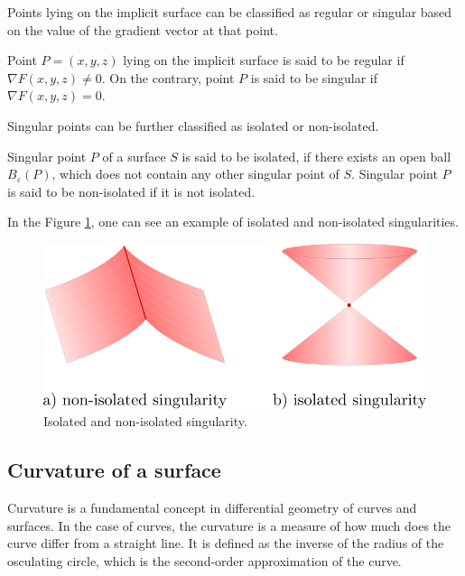 Points lying on the implicit surface can be classified as regular or
singular based on the value of the gradient vector at that point.

\begin{definition}
    Point $P=(x,y,z)$ lying on the implicit surface is said to be regular
    if $\nabla F(x, y, z) \neq 0$. On the contrary, point $P$ is said to be 
    singular if $\nabla F(x, y, z) = 0$.
\end{definition}

Singular points can be further classified as isolated or non-isolated.

\begin{definition}
    Singular point $P$ of a surface $S$ is said to be isolated,
    if there exists an open ball $B_\varepsilon(P)$, which does not 
    contain any other singular point of $S$.
    Singular point $P$ is said to be non-isolated if it is not isolated.
\end{definition}

In the Figure \ref{img:2}, one can see an example of isolated and non-isolated
singularities.

\begin{figure}
    \centerline{\includegraphics[scale=0.5]{images/img2}}
    \caption[Isolated and non-isolated singularity]
    {Isolated and non-isolated singularity.}
    \label{img:2}
\end{figure}

\subsection{Curvature of a surface}

Curvature is a fundamental concept in differential geometry of curves and surfaces.
In the case of curves, the curvature is a measure of how much does the curve differ from a 
straight line. It is defined as the inverse of the radius of the osculating circle,
which is the second-order approximation of the curve.

